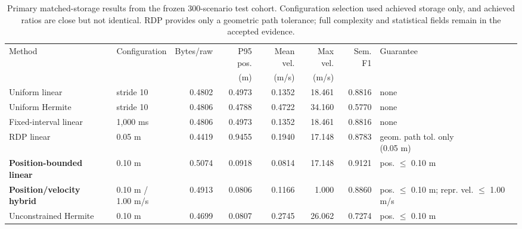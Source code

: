 \begin{table}[t]
\centering
\caption{Primary matched-storage results from the frozen 300-scenario test cohort. Configuration selection used achieved storage only, and achieved ratios are close but not identical. RDP provides only a geometric path tolerance; full complexity and statistical fields remain in the accepted evidence.}
\label{tab:primary-matched-byte}
\small
\setlength{\tabcolsep}{2pt}
\begin{tabular}{@{}llrrrrrl@{}}
\toprule
Method & Configuration & Bytes/raw & P95 pos. & Mean vel. & Max vel. & Sem. F1 & Guarantee \\
 &  &  & (m) & (m/s) & (m/s) &  &  \\
\midrule
Uniform linear & stride 10 & 0.4802 & 0.4973 & 0.1352 & 18.461 & 0.8816 & none \\
Uniform Hermite & stride 10 & 0.4806 & 0.4788 & 0.4722 & 34.160 & 0.5770 & none \\
Fixed-interval linear & 1,000 ms & 0.4806 & 0.4973 & 0.1352 & 18.461 & 0.8816 & none \\
RDP linear & 0.05 m & 0.4419 & 0.9455 & 0.1940 & 17.148 & 0.8783 & \shortstack[l]{geom. path tol. only\\(0.05 m)} \\
\addlinespace[2pt]
\textbf{Position-bounded linear} & 0.10 m & 0.5074 & 0.0918 & 0.0814 & 17.148 & 0.9121 & pos. $\leq$ 0.10 m \\
\textbf{Position/velocity hybrid} & \shortstack[l]{0.10 m /\\1.00 m/s} & 0.4913 & 0.0806 & 0.1166 & 1.000 & 0.8860 & \shortstack[l]{pos. $\leq$ 0.10 m;\\repr. vel. $\leq$ 1.00 m/s} \\
\addlinespace[2pt]
Unconstrained Hermite & 0.10 m & 0.4699 & 0.0807 & 0.2745 & 26.062 & 0.7274 & pos. $\leq$ 0.10 m \\
\bottomrule
\end{tabular}
\end{table}
